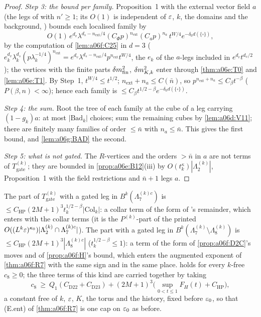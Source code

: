 \begin{proof}
\emph{Step 3: the bound per family.} Proposition~1 with the external vector field $a$ (the legs of \cite[(1.10)]{Ba3} with $n'\ge1$; its $O(1)$ is independent of $\varepsilon$, $k$, the domains and the background, \cite[p.~421]{Ba3}) bounds each localised family by
\[
O(1)\,e^{d_v}\lambda^{d_s-n_{\mathrm{ext}}/4}(C_\Phi p)^{n_{\mathrm{ext}}}(C_ap)^{n_a}\,t^{W/4}e^{-\delta_0d(\{\square\})},
\]
by the computation of \cref{lem:a06f:C25} in $d=3$ ($e_k^{d_v}\lambda_k^{d_s}(p\lambda_k^{-1/4})^{n_{\mathrm{ext}}}=e^{d_v}\lambda^{d_s-n_{\mathrm{ext}}/4}p^{n_{\mathrm{ext}}}t^{W/4}$, the $e_k$ of the $a$-legs included in $e^{d_v}t^{d_v/2}$); the \cite[(1.7)]{Ba3} vertices with the finite parts $\delta m^2_{\mathrm{fin}}$, $\delta m^2_{K,k}$ enter through \cref{thm:a06e:T0} and \cref{lem:a06e:T1}. By Step~1, $t^{W/4}\le t^{1/2}$; $n_{\mathrm{ext}}+n_a\le C(\bar n)$, so $p^{n_{\mathrm{ext}}+n_a}\le C_\beta t^{-\beta}$ ($P(\beta,n)<\infty$); hence each family is $\le C_\beta t^{1/2-\beta}e^{-\delta_0d(\{\square\})}$.

\emph{Step 4: the sum.} Root the tree of each family at the cube of a leg carrying $(1-g_k)a$: at most $|\mathrm{Bad}_k|$ choices; sum the remaining cubes by \cref{lem:a06d:V11}; there are finitely many families of order $\le\bar n$ with $n_a\le\bar n$. This gives the first bound, and \cref{lem:a06g:BAD} the second.

\emph{Step 5: what is not gated.} The $R$-vertices and the orders $>\bar n$ in $a$ are not terms of $T^{(k)}_{\mathrm{gate}}$; they are bounded in \cref{prop:a06e:B12}(iii) by $O(t_k^\kappa)|\Lambda^{(k)}_2|$, Proposition~1 with the field restrictions and $\bar n+1$ legs $a$.
\end{proof}

\begin{corollary}\label{cor:a06g:ledger}
The part of $T^{(k)}_{\mathrm{gate}}$ with a gated leg in $B^k(\Lambda^{(k)c}_7)$ is $\le C_{\mathrm{HP}}(2M+1)^3t_k^{1/2-\beta}|\mathrm{Col}_k|$: a collar term of the form of \cite[(2.57)]{Ba2}'s remainder, which enters \cite[(2.117)]{Ba2} with the collar terms (it is the $P^{(k)}$-part of the printed $O((L^k\varepsilon)^{\kappa_0})|\Lambda^{(k)}_2\cap\Lambda^{(k)c}_7|$). The part with a gated leg in $B^k(\Lambda^{(k)}_7\setminus\Lambda^{(k)}_8)$ is $\le C_{\mathrm{HP}}(2M+1)^3|\Lambda^{(k)c}_8|$ ($t_k^{1/2-\beta}\le1$): a term of the form of \cref{prop:a06f:D2C}'s moves and of \cref{prop:a06f:H}'s bound, which enters the augmented exponent of \cref{thm:a06f:R7} with the same sign and in the same place.  holds for every $k$-free $c_8\ge0$; the three terms of this kind are carried together by taking
\[
c_8\ \ge\ Q_1(C_{\mathrm{D22}}+C_{\mathrm{D23}})+(2M+1)^3\big(\sup_{0<t\le1}F_H(t)+C_{\mathrm{HP}}\big),
\]
a constant free of $k$, $\varepsilon$, $K$, the torus and the history, fixed before $\varepsilon_0$, so that (E.ent) of \cref{thm:a06f:R7} is one cap on $\varepsilon_0$ as before.
\end{corollary}


